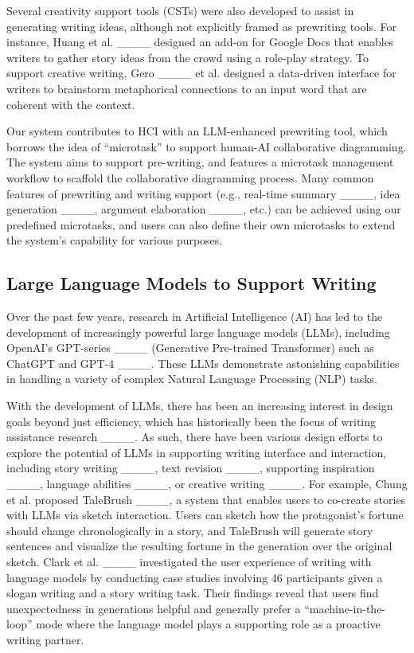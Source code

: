 Several creativity support tools (CSTs) were also developed to assist in generating writing ideas, although not explicitly framed as prewriting tools. For instance, Huang et al. ____ designed an add-on for Google Docs that enables writers to gather story ideas from the crowd using a role-play strategy. To support creative writing, Gero ____ et al. designed a data-driven interface for writers to brainstorm metaphorical connections to an input word that are coherent with the context.

Our system contributes to HCI with an LLM-enhanced prewriting tool, which borrows the idea of ``microtask'' to support human-AI collaborative diagramming. The system aims to support pre-writing, and features a microtask management workflow to scaffold the collaborative diagramming process.
Many common features of prewriting and writing support (e.g., real-time summary ____, idea generation ____, argument elaboration ____, etc.) can be achieved using our predefined microtasks, and users can also define their own microtasks to extend the system's capability for various purposes.

\subsection{Large Language Models to Support Writing}
Over the past few years, research in Artificial Intelligence (AI) has led to the development of increasingly powerful large language models (LLMs), including OpenAI's GPT-series ____ (Generative Pre-trained Transformer) such as ChatGPT and GPT-4 ____. These LLMs demonstrate astonishing capabilities in handling a variety of complex Natural Language Processing (NLP) tasks.

With the development of LLMs, there has been an increasing interest in design goals beyond just efficiency, which has historically been the focus of writing assistance research ____. As such, there have been various design efforts to explore the potential of LLMs in supporting writing interface and interaction, including story writing ____, text revision ____, supporting inspiration ____, language abilities ____, or creative writing ____. For example, Chung et al. proposed TaleBrush ____, a system that enables users to co-create stories with LLMs via sketch interaction. Users can sketch how the protagonist's fortune should change chronologically in a story, and TaleBrush will generate story sentences and visualize the resulting fortune in the generation over the original sketch. Clark et al. ____ investigated the user experience of writing with language models by conducting case studies involving 46 participants given a slogan writing and a story writing task. Their findings reveal that users find unexpectedness in generations helpful and generally prefer a ``machine-in-the-loop'' mode where the language model plays a supporting role as a proactive writing partner.


